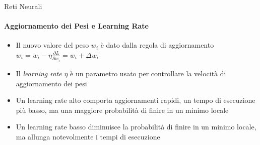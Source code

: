 \documentclass[
 ]{beamer}
\begin{document}
\begin{frame}{Reti Neurali}
    \framesubtitle{Aggiornamento dei Pesi e Learning Rate}
    
    \begin{itemize} [<+->]
        \setlength\itemsep{1.5em}
        \item \large Il nuovo valore del peso $w_i$ è dato dalla regola di aggiornamento  $w_i = w_i - \eta\frac{\partial L}{\partial w_i} = w_i + \Delta w_i$
        \item \large Il \emph{learning rate} $\eta$ è un parametro usato per controllare la velocità di aggiornamento dei pesi 
        \item \large Un learning rate alto comporta aggiornamenti rapidi, un tempo di esecuzione più basso, ma una maggiore probabilità di finire in un minimo locale
        \item \large Un learning rate basso diminuisce la probabilità di finire in un minimo locale, ma allunga notevolmente i tempi di esecuzione
    \end{itemize}      
\end{frame}
\end{document}
